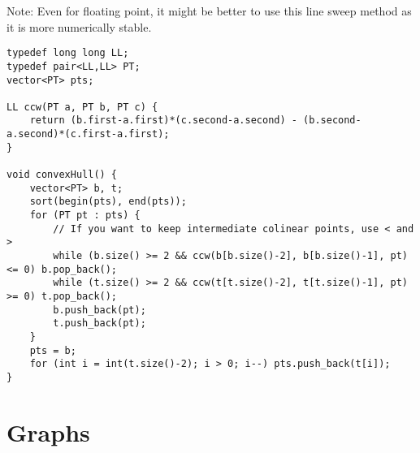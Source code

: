 \documentclass[letterpaper]{article}
\begin{document}
Note: Even for floating point, it might be better to use this line sweep method as it is more numerically stable.

\begin{lstlisting}
typedef long long LL;
typedef pair<LL,LL> PT;
vector<PT> pts;

LL ccw(PT a, PT b, PT c) {
	return (b.first-a.first)*(c.second-a.second) - (b.second-a.second)*(c.first-a.first);
}

void convexHull() {
	vector<PT> b, t;
	sort(begin(pts), end(pts));
	for (PT pt : pts) {
		// If you want to keep intermediate colinear points, use < and >
		while (b.size() >= 2 && ccw(b[b.size()-2], b[b.size()-1], pt) <= 0) b.pop_back();
		while (t.size() >= 2 && ccw(t[t.size()-2], t[t.size()-1], pt) >= 0) t.pop_back();
		b.push_back(pt);
		t.push_back(pt);
	}
	pts = b;
	for (int i = int(t.size()-2); i > 0; i--) pts.push_back(t[i]);
}
\end{lstlisting}

\clearpage

\section{Graphs}
\end{document}
